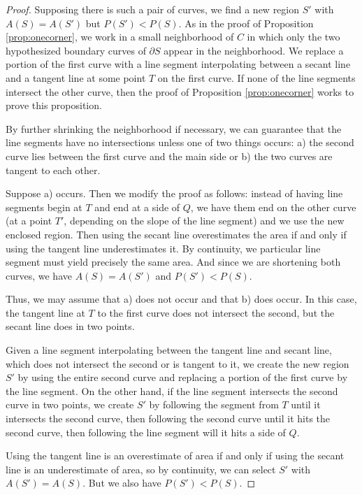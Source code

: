 \documentclass[leqno]{article}
\numberwithin{equation}{section}
\theoremstyle{definition}
\theoremstyle{remark}
\theoremstyle{plain}
\begin{document}
\begin{proof}  Supposing there is such a pair of curves, we find a new region $S'$ with $A(S) = A(S')$ but $P(S') < P(S)$.   As in the proof of Proposition \ref{prop:onecorner}, we work in a small neighborhood of $C$ in which only the two hypothesized boundary curves of $\partial S$ appear in the neighborhood.  We replace a portion of the first curve with a line segment interpolating between a secant line and a tangent line at some point $T$ on the first curve.  If none of the line segments intersect the other curve, then the proof of Proposition \ref{prop:onecorner} works to prove this proposition.

By further shrinking the neighborhood if necessary, we can guarantee that the line segments have no intersections unless one of two things occurs: a) the second curve lies between the first curve and the main side or b) the two curves are tangent to each other.

Suppose a) occurs.  Then we modify the proof as follows: instead of having line segments begin at $T$ and end at a side of $Q$, we have them end on the other curve (at a point $T'$, depending on the slope of the line segment) and we use the new enclosed region.  Then using the secant line overestimates the area if and only if using the tangent line underestimates it.  By continuity, we particular line segment must yield precisely the same area.  And since we are shortening both curves, we have $A(S) = A(S')$ and $P(S' ) < P(S)$.

Thus, we may assume that a) does not occur and that b) does occur.  In this case, the tangent line at $T$ to the first curve does not intersect the second, but the secant line does in two points.

Given a line segment interpolating between the tangent line and secant line, which does not intersect the second or is tangent to it,  we create the new region $S'$ by using the entire second curve and replacing a portion of the first curve by the line segment.  On the other hand, if the line segment intersects the second curve in two points, we create $S'$  by following the segment from $T$ until it intersects the second curve, then following the second curve until it hits the second curve, then following the line segment will it hits a side of $Q$.

Using the tangent line is an overestimate of area if and only if using the secant line is an underestimate of area, so by continuity, we can select $S'$ with $A(S') = A(S)$.  But we also have $P(S') < P(S)$.
\end{proof}
\end{document}
